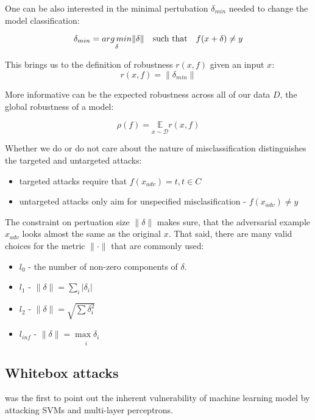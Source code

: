 One can be also interested in the minimal pertubation $\delta_{min}$ needed to change the model classification:

$$\delta_{min} = \underset{\delta}{arg\,min} \lVert \delta \rVert \quad \text{such that} \quad f(x + \delta) \neq y$$

This brings us to the definition of robustness $r(x, f)$ given an input $x$:
$$r(x, f) = \lVert \delta_{min} \rVert$$

More informative can be the expected robustness across all of our data $D$, the global robustness of a model:

$$\rho (f) = \underset{x \sim \mathcal D}{\mathbb E} r(x, f)$$

Whether we do or do not care about the nature of misclassification distinguishes the targeted and untargeted attacks:

\begin{itemize}
    \item targeted attacks require that $f(x_{adv}) = t, t \in C$
    \item untargeted attacks only aim for unspecified misclasification - $f(x_{adv}) \neq y$
\end{itemize}


The constraint on pertuation size $\lVert \delta \rVert$ makes sure, that the adversarial example $x_{adv}$ looks almost the same as the original $x$. That said, there are many valid choices for the metric $\lVert \cdot \rVert$ that are commonly used:

\begin{itemize}
    \item $l_{0}$ - the number of non-zero components of $\delta$.
    \item $l_{1}$ - $\lVert \delta \rVert = \underset{i}{\sum} \lvert \delta_{i} \rvert$
    \item $l_{2}$ - $\lVert \delta \rVert = \sqrt{\sum \delta_{i}^2}$
    \item $l_{inf}$ - $\lVert \delta \rVert = \underset{i}{\max \delta_{i}}$
\end{itemize}



\subsection{Whitebox attacks}

\cite{Biggio2013EvasionAA} was the first to point out the inherent vulnerability of machine learning model by attacking SVMs and multi-layer perceptrons.


